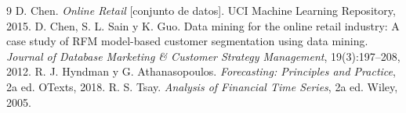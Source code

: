\documentclass[11pt]{article}
\begin{document}
\begin{thebibliography}{9}
 D. Chen. \emph{Online Retail} [conjunto de datos]. UCI Machine Learning Repository, 2015.
 D. Chen, S. L. Sain y K. Guo. Data mining for the online retail industry: A case study of RFM
model-based customer segmentation using data mining. \emph{Journal of Database Marketing \& Customer Strategy
Management}, 19(3):197--208, 2012.
 R. J. Hyndman y G. Athanasopoulos. \emph{Forecasting: Principles and Practice}, 2a ed. OTexts, 2018.
 R. S. Tsay. \emph{Analysis of Financial Time Series}, 2a ed. Wiley, 2005.
\end{thebibliography}
\end{document}
